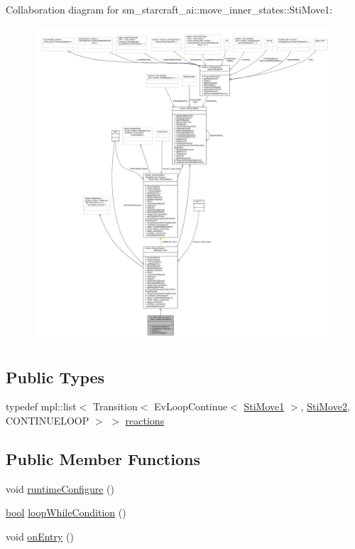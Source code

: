 Collaboration diagram for sm\+\_\+starcraft\+\_\+ai\+:\+:move\+\_\+inner\+\_\+states\+:\+:Sti\+Move1\+:
\nopagebreak
\begin{figure}[H]
\begin{center}
\leavevmode
\includegraphics[width=350pt]{structsm__starcraft__ai_1_1move__inner__states_1_1StiMove1__coll__graph}
\end{center}
\end{figure}
\subsection*{Public Types}
\begin{DoxyCompactItemize}
\item 
typedef mpl\+::list$<$ Transition$<$ Ev\+Loop\+Continue$<$ \hyperlink{structsm__starcraft__ai_1_1move__inner__states_1_1StiMove1}{Sti\+Move1} $>$, \hyperlink{structsm__starcraft__ai_1_1move__inner__states_1_1StiMove2}{Sti\+Move2}, C\+O\+N\+T\+I\+N\+U\+E\+L\+O\+OP $>$ $>$ \hyperlink{structsm__starcraft__ai_1_1move__inner__states_1_1StiMove1_a6229ca10912d8860ea23e26acc27b3df}{reactions}
\end{DoxyCompactItemize}
\subsection*{Public Member Functions}
\begin{DoxyCompactItemize}
\item 
void \hyperlink{structsm__starcraft__ai_1_1move__inner__states_1_1StiMove1_a0d0fc4260984916f5b9a77d1854560c9}{runtime\+Configure} ()
\item 
\hyperlink{classbool}{bool} \hyperlink{structsm__starcraft__ai_1_1move__inner__states_1_1StiMove1_a04efabda7c4d09fdab6d4c74274cd9d5}{loop\+While\+Condition} ()
\item 
void \hyperlink{structsm__starcraft__ai_1_1move__inner__states_1_1StiMove1_aed05ed4ebfe0b64d2e585268cdc7bf31}{on\+Entry} ()
\end{DoxyCompactItemize}
